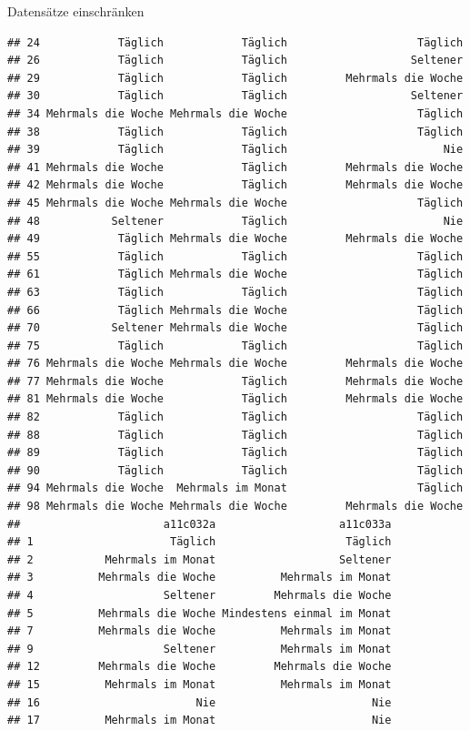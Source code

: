 \documentclass[ignorenonframetext,]{beamer}
\begin{document}
\begin{frame}[fragile]{Datensätze einschränken}
\begin{verbatim}
## 24            Täglich            Täglich                    Täglich
## 26            Täglich            Täglich                   Seltener
## 29            Täglich            Täglich         Mehrmals die Woche
## 30            Täglich            Täglich                   Seltener
## 34 Mehrmals die Woche Mehrmals die Woche                    Täglich
## 38            Täglich            Täglich                    Täglich
## 39            Täglich            Täglich                        Nie
## 41 Mehrmals die Woche            Täglich         Mehrmals die Woche
## 42 Mehrmals die Woche            Täglich         Mehrmals die Woche
## 45 Mehrmals die Woche Mehrmals die Woche                    Täglich
## 48           Seltener            Täglich                        Nie
## 49            Täglich Mehrmals die Woche         Mehrmals die Woche
## 55            Täglich            Täglich                    Täglich
## 61            Täglich Mehrmals die Woche                    Täglich
## 63            Täglich            Täglich                    Täglich
## 66            Täglich Mehrmals die Woche                    Täglich
## 70           Seltener Mehrmals die Woche                    Täglich
## 75            Täglich            Täglich                    Täglich
## 76 Mehrmals die Woche Mehrmals die Woche         Mehrmals die Woche
## 77 Mehrmals die Woche            Täglich         Mehrmals die Woche
## 81 Mehrmals die Woche            Täglich         Mehrmals die Woche
## 82            Täglich            Täglich                    Täglich
## 88            Täglich            Täglich                    Täglich
## 89            Täglich            Täglich                    Täglich
## 90            Täglich            Täglich                    Täglich
## 94 Mehrmals die Woche  Mehrmals im Monat                    Täglich
## 98 Mehrmals die Woche Mehrmals die Woche         Mehrmals die Woche
##                      a11c032a                   a11c033a
## 1                     Täglich                    Täglich
## 2           Mehrmals im Monat                   Seltener
## 3          Mehrmals die Woche          Mehrmals im Monat
## 4                    Seltener         Mehrmals die Woche
## 5          Mehrmals die Woche Mindestens einmal im Monat
## 7          Mehrmals die Woche          Mehrmals im Monat
## 9                    Seltener          Mehrmals im Monat
## 12         Mehrmals die Woche         Mehrmals die Woche
## 15          Mehrmals im Monat          Mehrmals im Monat
## 16                        Nie                        Nie
## 17          Mehrmals im Monat                        Nie

\end{verbatim}
\end{frame}
\end{document}
